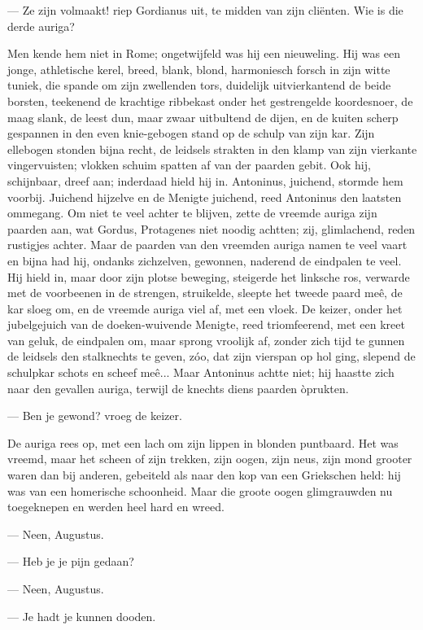 \documentclass[a4paper, 12pt, oneside, dutch]{article}
\begin{document}
--- Ze zijn volmaakt! riep Gordianus uit, te midden van zijn cliënten. Wie is die derde auriga?

Men kende hem niet in Rome; ongetwijfeld was hij een nieuweling. Hij was een jonge, athletische kerel, breed, blank, blond, harmoniesch forsch in zijn witte tuniek, die spande om zijn zwellenden tors, duidelijk uitvierkantend de beide borsten, teekenend de krachtige ribbekast onder het gestrengelde koordesnoer, de maag slank, de leest dun, maar zwaar uitbultend de dijen, en de kuiten scherp gespannen in den even knie-gebogen stand op de schulp van zijn kar. Zijn ellebogen stonden bijna recht, de leidsels strakten in den klamp van zijn vierkante vingervuisten; vlokken schuim spatten af van der paarden gebit. Ook hij, schijnbaar, dreef aan; inderdaad hield hij in. Antoninus, juichend, stormde hem voorbij. Juichend hijzelve en de Menigte juichend, reed Antoninus den laatsten ommegang. Om niet te veel achter te blijven, zette de vreemde auriga zijn paarden aan, wat Gordus, Protagenes niet noodig achtten; zij, glimlachend, reden rustigjes achter. Maar de paarden van den vreemden auriga namen te veel vaart en bijna had hij, ondanks zichzelven, gewonnen, naderend de eindpalen te veel. Hij hield in, maar door zijn plotse beweging, steigerde het linksche ros, verwarde met de voorbeenen in de strengen, struikelde, sleepte het tweede paard meê, de kar sloeg om, en de vreemde auriga viel af, met een vloek. De keizer, onder het jubelgejuich van de doeken-wuivende Menigte, reed triomfeerend, met een kreet van geluk, de eindpalen om, maar sprong vroolijk af, zonder zich tijd te gunnen de leidsels den stalknechts te geven, zóo, dat zijn vierspan op hol ging, slepend de schulpkar schots en scheef meê... Maar Antoninus achtte niet; hij haastte zich naar den gevallen auriga, terwijl de knechts diens paarden òprukten.

--- Ben je gewond? vroeg de keizer.

De auriga rees op, met een lach om zijn lippen in blonden puntbaard. Het was vreemd, maar het scheen of zijn trekken, zijn oogen, zijn neus, zijn mond grooter waren dan bij anderen, gebeiteld als naar den kop van een Griekschen held: hij was van een homerische schoonheid. Maar die groote oogen glimgrauwden nu toegeknepen en werden heel hard en wreed.

--- Neen, Augustus.

--- Heb je je pijn gedaan?

--- Neen, Augustus.

--- Je hadt je kunnen dooden.
\end{document}
